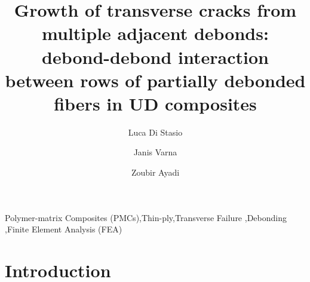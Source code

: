 \documentclass[review]{elsarticle}
\begin{document}
\begin{frontmatter}

\title{Growth of transverse cracks from multiple adjacent debonds: debond-debond interaction between rows of partially debonded fibers in UD composites}


\author[nancy,lulea]{Luca Di Stasio}
\author[lulea]{Janis Varna}
\author[nancy]{Zoubir Ayadi}


\address[nancy]{Universit\'e de Lorraine, EEIGM, IJL, 6 Rue Bastien Lepage, F-54010 Nancy, France}
\address[lulea]{Lule\aa\ University of Technology, University Campus, SE-97187 Lule\aa, Sweden}

\begin{abstract}
\noindent
\end{abstract}

\begin{keyword}
Polymer-matrix Composites (PMCs)\sep Thin-ply\sep Transverse Failure \sep Debonding \sep Finite Element Analysis (FEA)
\end{keyword}


\end{frontmatter}

\linenumbers


\section{Introduction}
\end{document}
